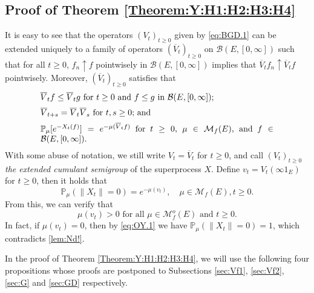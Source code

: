\documentclass[12pt,a4paper]{amsart}
\numberwithin{equation}{section}
\theoremstyle{plain}
\theoremstyle{definition}
\theoremstyle{remark}
\begin{document}
\subsection{Proof of Theorem \ref{Theorem:Y:H1:H2:H3:H4}} \label{subsec:OY}
	It is easy to see that the operators $(V_t)_{t\geq 0}$
	given by \eqref{eq:BGD.1} can be extended uniquely to a family of operators $(\overline V_t)_{t\geq 0}$ on $\mathcal B(E,[0,\infty])$ such that for all $t\geq 0$, $f_n \uparrow f$ pointwisely in  $\mathcal B(E, [0,\infty])$ implies that $\overline V_tf_n \uparrow \overline V_tf$ pointwisely.
	Moreover, $(\overline V_t)_{t\geq 0}$ satisfies that
\begin{equation}
\begin{minipage}{0.8\textwidth}
	$\overline V_t f \leq \overline V_t g$ for $t\geq 0$ and $f\leq g$ in $\mathcal B(E,[0,\infty])$;
\end{minipage}\label{Fact:BV!}
\end{equation}
\begin{equation}
\begin{minipage}{0.8\textwidth}
	$\overline V_{t+s} = \overline V_t \overline V_s$ for $t, s\geq 0$;  and
\end{minipage} \label{eq:OY.0}
\end{equation}
\begin{equation}
\begin{minipage}{0.8\textwidth}
	$\mathbb P_\mu [e^{-X_t(f)}] = e^{- \mu(\overline V_tf)}$ for $t\geq 0$, $\mu \in \mathcal M_f(E)$, and $f\in \mathcal B(E,[0,\infty])$.
\end{minipage} \label{eq:BGD.2}
\end{equation}
	With some abuse of notation, we still write $V_t = \overline V_t$ for $t\geq 0$, and call $(V_t)_{t\geq 0}$ \emph{the extended cumulant semigroup} of the superprocess $X$.
	Define $v_t = V_t(\infty  1_E)$ for $t\geq 0$, then it holds that
\begin{equation} \label{eq:OY.1}
	\mathbb P_\mu (\|X_t\| = 0)
	= e^{- \mu (v_t)},
	\quad \mu \in \mathcal M_f(E), t\geq 0.
\end{equation}
	From this, we can verify that
\begin{equation}\label{lem:sv2!}
	\text{$\mu(v_t) > 0$ for all $\mu \in \mathcal M_f^o(E)$ and $t \geq 0$.}
\end{equation}
	In fact, if $\mu(v_t) = 0$, then by \eqref{eq:OY.1} we have $\mathbb P_\mu(\|X_t \| = 0) = 1$, which contradicts \eqref{lem:Nd!}.

	In the  proof of Theorem \ref{Theorem:Y:H1:H2:H3:H4}, we will use the following four propositions whose proofs are postponed to Subsections \ref{sec:Vf1}, \ref{sec:Vf2}, \ref{sec:G} and \ref{sec:GD} respectively.
\end{document}
